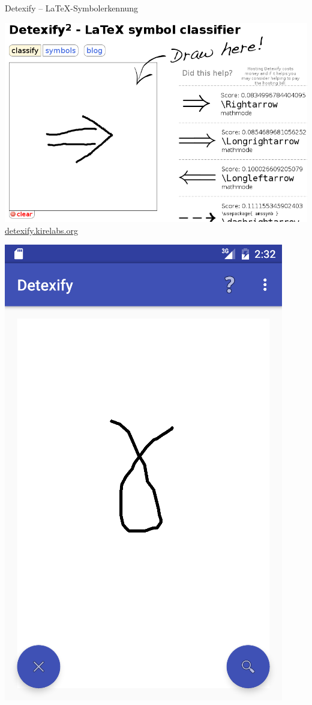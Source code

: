 \documentclass{beamer}
\begin{document}
		\begin{frame}{Detexify -- \LaTeX-Symbolerkennung}
		\begin{minipage}[0.5\textheight]{0.5\textwidth}
			\begin{center}
			\includegraphics[height=0.48\textheight]{images/detexify}
			\vspace{0.5cm}
			\Large \href{http://detexify.kirelabs.org/}{detexify.kirelabs.org}
			\end{center}
		\end{minipage}
		\begin{minipage}{0.45\textwidth}
			\begin{center}
			\includegraphics[height=0.48\textheight]{images/detexify-app1}

\end{center}
\end{minipage}
\end{frame}
\end{document}
